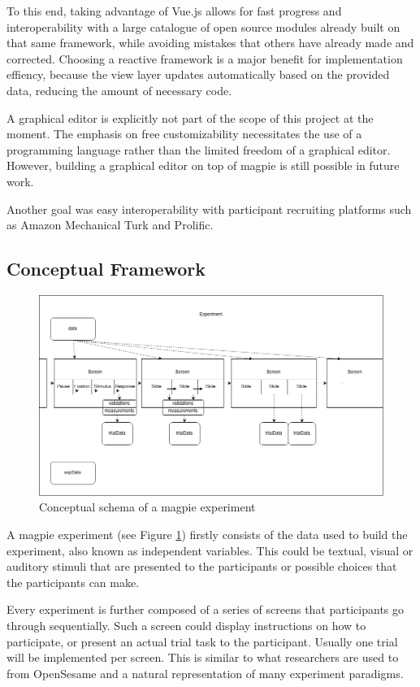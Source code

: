 \documentclass[a4paper,11pt]{scrreprt}
\begin{document}
To this end, taking advantage of Vue.js allows for fast progress and interoperability with a large catalogue of open source modules already built on that same framework, while avoiding mistakes that others have already made and corrected. Choosing a reactive framework is a major benefit for implementation effiency, because the view layer updates automatically based on the provided data, reducing the amount of necessary code.

A graphical editor is explicitly not part of the scope of this project at the moment. The emphasis on free customizability necessitates the use of a programming language rather than the limited freedom of a graphical editor. However, building a graphical editor on top of magpie is still possible in future work.

Another goal was easy interoperability with participant recruiting platforms such as Amazon Mechanical Turk and Prolific.

\subsection{Conceptual Framework}

\begin{figure}[h]
\includegraphics[width=\textwidth]{experiments_schema.png}
\caption{Conceptual schema of a magpie experiment}
\label{fig:concepts}
\end{figure}

A magpie experiment (see Figure \ref{fig:concepts}) firstly consists of the data used to build the experiment, also known as independent variables.
This could be textual, visual or auditory stimuli that are presented to the participants or possible choices that the participants can make.

Every experiment is further composed of a series of screens that participants go through sequentially. Such a screen could display instructions on how to participate, or present an actual trial task to the participant. Usually one trial will be implemented per screen. This is similar to what researchers are used to from OpenSesame \citep{Mathot2012} and a natural representation of many experiment paradigms.
\end{document}
